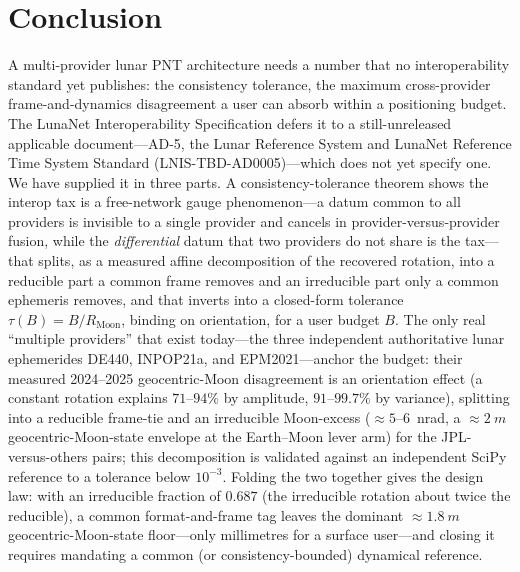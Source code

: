 \section{Conclusion}
\label{sec:conclusion}

A multi-provider lunar PNT architecture needs a number that no interoperability
standard yet publishes: the consistency tolerance, the maximum cross-provider
frame-and-dynamics disagreement a user can absorb within a positioning budget. The
LunaNet Interoperability Specification defers it to a still-unreleased applicable
document---AD-5, the Lunar Reference System and LunaNet Reference Time System Standard
({LNIS-TBD-AD0005})---which does not yet specify one. We have supplied it in three
parts. A consistency-tolerance theorem shows the interop tax is a free-network gauge
phenomenon---a datum common to all providers is invisible to a single provider and
cancels in provider-versus-provider fusion, while the \emph{differential} datum that
two providers do not share is the tax---that splits, as a measured affine
decomposition of the recovered rotation, into a reducible part a common frame removes
and an irreducible part only a common ephemeris removes, and that inverts into a
closed-form tolerance $\tau(B)=B/R_{\mathrm{Moon}}$, binding on orientation, for a
user budget $B$. The only real ``multiple providers'' that exist today---the three
independent authoritative lunar ephemerides DE440, INPOP21a, and EPM2021---anchor the
budget: their measured 2024--2025 geocentric-Moon disagreement is an orientation
effect (a constant rotation explains $71$--$94\%$ by amplitude, $91$--$99.7\%$ by
variance), splitting into a reducible frame-tie and an irreducible Moon-excess
($\approx\!5$--$6$~nrad, a $\approx\!\SI{2}{m}$ geocentric-Moon-state envelope at the
Earth--Moon lever arm) for the JPL-versus-others pairs; this decomposition is
validated against an independent SciPy reference to a tolerance below $10^{-3}$.
Folding the two together gives the design law: with an irreducible fraction of
$0.687$ (the irreducible rotation about twice the reducible), a common
format-and-frame tag leaves the dominant $\approx\!\SI{1.8}{m}$ geocentric-Moon-state
floor---only millimetres for a surface user---and closing it requires mandating a
common (or consistency-bounded) dynamical reference.

